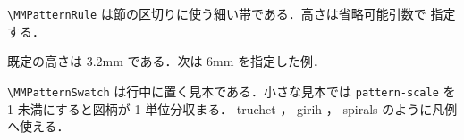 \documentclass[lualatex,paper=b5j,fontsize=10pt]{jlreq}
\begin{document}

\noindent
\verb|\MMPatternRule| は節の区切りに使う細い帯である．高さは省略可能引数で
指定する．

\MMPatternRule

\noindent
既定の高さは 3.2mm である．次は 6mm を指定した例．

\MMPatternRule[6mm]

\noindent
\verb|\MMPatternSwatch| は行中に置く見本である．小さな見本では
\verb|pattern-scale| を 1 未満にすると図柄が 1 単位分収まる．
%
truchet \MMPatternSwatch{11mm}，
girih \MMPatternSwatch{11mm}，
spirals \MMPatternSwatch{11mm}
のように凡例へ使える．
\end{document}

